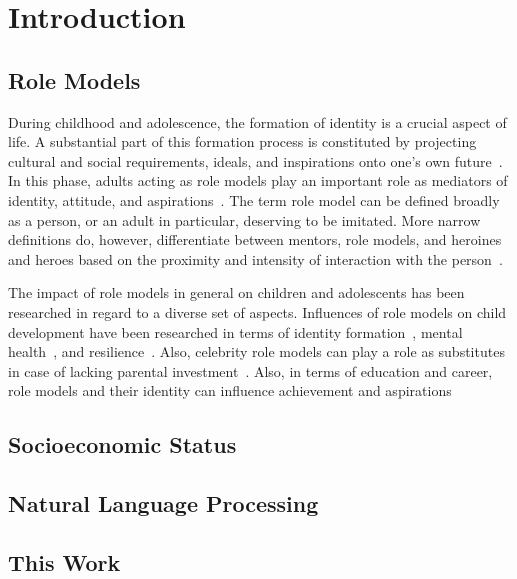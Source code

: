\renewcommand{\imagepath}{../10-intro/img}

\chapter{Introduction}

\section{Role Models}
During childhood and adolescence, the formation of identity is a crucial aspect of life. A substantial part of this formation process is constituted by projecting cultural and social requirements, ideals, and inspirations onto one's own future~\autocite{mcadams_psychology_2001}. In this phase, adults acting as role models play an important role as mediators of identity, attitude, and aspirations~\autocite{hurd_role_2011-1, morgenroth_how_2015}. The term role model can be defined broadly as a person, or an adult in particular, deserving to be imitated. More narrow definitions do, however, differentiate between mentors, role models, and heroines and heroes based on the proximity and intensity of interaction with the person~\autocite{pleiss_mentors_1995}.

The impact of role models in general on children and adolescents has been researched in regard to a diverse set of aspects. Influences of role models on child development have been researched in terms of identity formation~\autocite{vecci_behavioural_2019}, mental health~\autocite{bird_impact_2012}, and resilience~\autocite{werner_resilience_1995}. Also, celebrity role models can play a role as substitutes in case of lacking parental investment~\autocite{cheung_idol_2012}. Also, in terms of education and career, role models and their identity can influence achievement and aspirations~\autocite{zirkel_is_2002, herrmann_effects_2016}


\section{Socioeconomic Status}

\section{Natural Language Processing}

\section{This Work}

